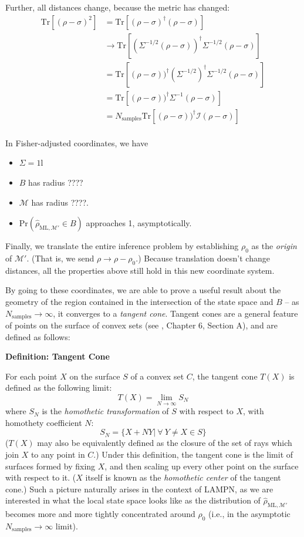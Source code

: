 \documentclass[aps,pra, twocolumn]{revtex4-1}
\newcommand{\M}{\mathcal{M}}
\newcommand{\Id}{\mathbb{I}}
\def\Id{1\!\mathrm{l}}
\newcommand{\rhohat}{\hat{\rho}}
\newcommand{\rhoML}[1]{\rhohat_{\scriptscriptstyle{\mathrm{ML},#1}}}
\begin{document}
Further, all distances change, because the metric has changed:
\begin{align*}
\mathrm{Tr}[(\rho - \sigma)^{2}] &= \mathrm{Tr}[(\rho - \sigma)^{\dagger}(\rho-\sigma)]\\
&\rightarrow \mathrm{Tr}[(\Sigma^{-1/2}(\rho - \sigma))^{\dagger}\Sigma^{-1/2}(\rho - \sigma)]\\
& = \mathrm{Tr}[(\rho - \sigma))^{\dagger}(\Sigma^{-1/2})^{\dagger}\Sigma^{-1/2}(\rho - \sigma)]\\
& = \mathrm{Tr}[(\rho - \sigma))^{\dagger}\Sigma^{-1}(\rho - \sigma)]\\
& = N_{\mathrm{samples}}\mathrm{Tr}[(\rho - \sigma))^{\dagger}\mathcal{I}(\rho - \sigma)]\\
\end{align*}

In Fisher-adjusted coordinates, we have

 \begin{itemize}
 \item $\Sigma = \Id$
 \item $B$ has radius ????
 \item $\M$ has radius ????.
 \item $\mathrm{Pr}\left(\rhoML{\M'} \in B\right)$ approaches 1, asymptotically.
 \end{itemize}

Finally, we translate the entire inference problem by establishing $\rho_{0}$ as the \emph{origin} of $\M'$. (That is, we send $\rho \rightarrow \rho - \rho_{0}$.) Because translation doesn't change distances, all the properties above still hold in this new coordinate system.

By going to these coordinates, we are able to prove a useful result about the geometry of the region contained in the intersection of the state space and $B$ --  as $N_{\mathrm{samples}} \rightarrow \infty$, it converges to a \emph{tangent cone}. Tangent cones are a general feature of points on the surface of convex sets (see \cite{Rockafellar1998}, Chapter 6, Section A), and are defined as follows:

\textbf{Definition: Tangent Cone}

For each point $X$ on the surface $S$ of a convex set $C$, the tangent cone $T(X)$ is defined as the following limit:
\[T(X) = \lim_{N\rightarrow \infty} S_{N}\]
where $S_{N}$ is the \emph{homothetic transformation} of $S$ with respect to $X$, with homothety coefficient $N$:
\[S_{N} = \{X + NY  |~\forall ~Y \neq X \in S\}\]
($T(X)$ may also be equivalently defined as the closure of the set of rays which join $X$ to any point in $C$.)
Under this definition, the tangent cone  is the limit of surfaces formed by fixing $X$, and then scaling up every other point on the surface with respect to it. ($X$ itself is known as the \emph{homothetic center} of the tangent cone.) Such a picture naturally arises in the context of LAMPN, as we are interested in what the local state space looks like as the distribution of $\rhoML{\M'}$ becomes more and more tightly concentrated around $\rho_{0}$ (i.e., in the asymptotic $N_{\mathrm{samples}}\rightarrow \infty$ limit).
\end{document}
